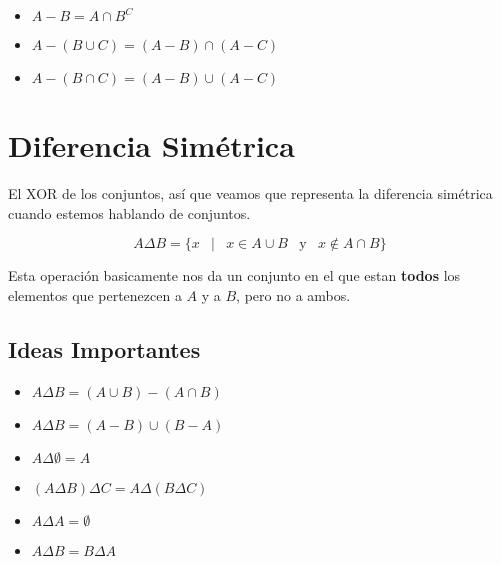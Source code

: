 \documentclass[12pt, fleqn]{report}                             %
\DeclareMathOperator \Space {\quad}                             %
\DeclareMathOperator \MiniSpace {\;}                            %
\newcommand \Such {\MiniSpace|\MiniSpace}                       %
\newcommand \Also {\MiniSpace \text{y} \MiniSpace}              %
\begin{document}
                \begin{itemize}
                    \item $A - B = A \cap B^C$

                    \item $A - (B \cup C) = (A - B) \cap (A - C)$

                    \item $A - (B \cap C) = (A - B) \cup (A - C)$

                \end{itemize}




        \clearpage
        \section{Diferencia Simétrica}

            El XOR de los conjuntos, así que veamos que representa la diferencia simétrica cuando estemos
            hablando de conjuntos.

            \begin{equation}
                A \Delta B = \{ x \Such x \in A \cup B \Also  x \notin A \cap B \}
            \end{equation}

            Esta operación basicamente nos da un conjunto en el que estan \textbf{todos} los elementos
            que pertenezcen a $A$ y a $B$, pero no a ambos.

            \subsection{Ideas Importantes}

                \begin{itemize}
                    \item $A \Delta B = (A \cup B) - ( A \cap B)$

                    \item $A \Delta B = (A - B) \cup ( B - A)$

                    \item $A \Delta \emptyset = A$

                    \item $(A \Delta B) \Delta C = A \Delta (B \Delta C)$

                    \item $A \Delta A = \emptyset$

                    \item $A \Delta B = B \Delta A$

                \end{itemize}
\end{document}
